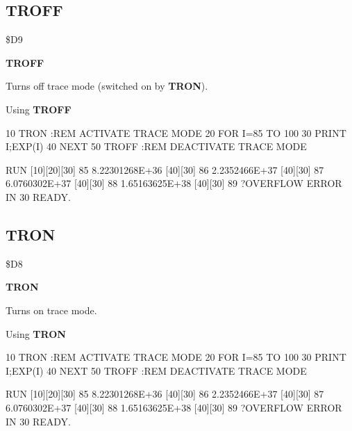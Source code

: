 
\newpage
\subsection{TROFF}
\begin{description}[leftmargin=3cm,style=nextline]
\item [Token:] \$D9
\item [Format:] {\bf TROFF}
\item [Usage:]  Turns off trace mode (switched on by {\bf TRON}).

\item [Example:] Using {\bf TROFF}
\begin{screenoutput}
 10 TRON             :REM ACTIVATE TRACE MODE
 20 FOR I=85 TO 100
 30 PRINT I;EXP(I)
 40 NEXT
 50 TROFF            :REM DEACTIVATE TRACE MODE

RUN
[10][20][30] 85  8.22301268E+36
[40][30] 86  2.2352466E+37
[40][30] 87  6.0760302E+37
[40][30] 88  1.65163625E+38
[40][30] 89
?OVERFLOW ERROR IN 30
READY.
\end{screenoutput}
\end{description}


\newpage
\subsection{TRON}
\begin{description}[leftmargin=3cm,style=nextline]
\item [Token:] \$D8
\item [Format:] {\bf TRON}
\item [Usage:]  Turns on trace mode.

\item [Example:] Using {\bf TRON}
\begin{screenoutput}
 10 TRON             :REM ACTIVATE TRACE MODE
 20 FOR I=85 TO 100
 30 PRINT I;EXP(I)
 40 NEXT
 50 TROFF            :REM DEACTIVATE TRACE MODE

RUN
[10][20][30] 85  8.22301268E+36
[40][30] 86  2.2352466E+37
[40][30] 87  6.0760302E+37
[40][30] 88  1.65163625E+38
[40][30] 89
?OVERFLOW ERROR IN 30
READY.
\end{screenoutput}
\end{description}


\newpage
